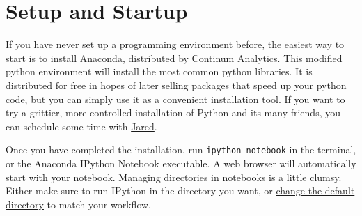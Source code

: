 \documentclass[justified, nobib]{tufte-handout}
\makeatletter
\newcommand{\anacondaLink}{https://store.continuum.io/cshop/anaconda/}
\newcommand{\email}{mailto:jgarst@ucdavis.edu}
\newcommand{\customizeDirectoryLink}
  {http://stackoverflow.com/questions/15680463/change-ipython-working-directory}
\makeatother
\begin{document}
\section*{Setup and Startup}
If you have never set up a programming environment before, the easiest way to
start is to install \href{\anacondaLink}{Anaconda}, distributed by Continum
Analytics. This modified python environment will install the most common python
libraries. It is distributed for free in hopes of later selling packages that
speed up your python code, but you can simply use it as a convenient
installation tool. If you want to try a grittier, more controlled installation
of Python and its many friends, you can schedule some time with
\href{\email}{Jared}.

\smallskip
\noindent
Once you have completed the installation, run \texttt{ipython notebook} in the
terminal, or the Anaconda IPython Notebook executable. A web browser will
automatically start with your notebook. Managing directories in notebooks is a
little clumsy. Either make sure to run IPython in the directory you want, or
\href{\customizeDirectoryLink}{change the default directory} to match your
workflow.
\end{document}

